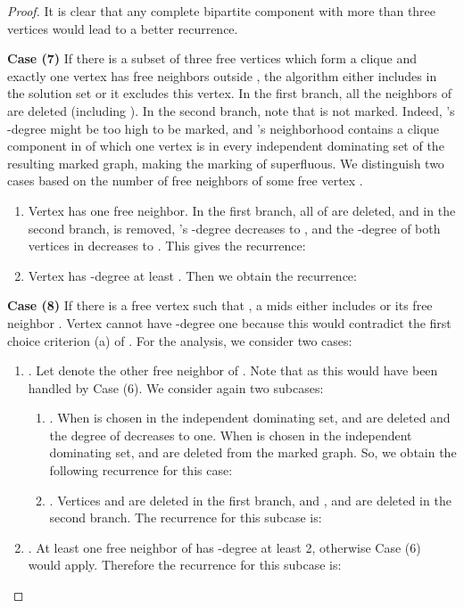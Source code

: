 \documentclass[a4paper,10pt]{article}
\theoremstyle{plain}
\theoremstyle{definition}
\theoremstyle{remark}
\newcommand{\ids}{independent dominating set\xspace}
\newcommand{\mids}{mids\xspace}
\begin{document}
\begin{proof}
It is clear that any complete bipartite component with more than three
vertices would lead to a better recurrence.

{\bf Case (7)}
If there is a subset  of three free vertices which form a clique and exactly one vertex 
has free neighbors outside , the algorithm either includes  in the solution set or it
excludes this vertex. In the first branch, all the neighbors of  are deleted
(including ). In the second branch, note that  is not marked. Indeed, 's -degree
might be too high to be marked, and 's neighborhood contains a clique component in  of which one vertex is in every
\ids of the resulting marked graph, making the marking of  superfluous.
We distinguish two cases based on the number of free neighbors of some free vertex .
\begin{enumerate}
\item Vertex  has one free neighbor. In the first branch, all of  are deleted, and in the second branch,  is removed,
's -degree decreases to , and the -degree of both vertices in  decreases to .
This gives the recurrence:

\item Vertex  has -degree at least . Then we obtain the recurrence:

\end{enumerate}

{\bf Case (8)}
If there is a free vertex  such that , a \mids either includes 
or its free neighbor . Vertex  cannot have -degree one
because this would contradict the first choice criterion (a) of . For the analysis, we
consider two cases:
\begin{enumerate}
\item . Let  denote the other free neighbor of . Note that 
 as this would have been handled by Case (6).
We consider again two subcases:
\begin{enumerate}
\item . When  is chosen in the \ids,  and  are deleted and the
degree of  decreases to one. When  is chosen in the \ids,  and 
are deleted from the marked graph. So, we obtain the following recurrence for
this case:


\item . Vertices  and  are deleted in the first branch,
and ,  and  are deleted in the
second branch. The recurrence for this subcase is:

\end{enumerate}

\item . At least one free neighbor of  has -degree at
least 2, otherwise Case (6) would apply. Therefore the recurrence
for this subcase is:


\end{enumerate}
\end{proof}
\end{document}
